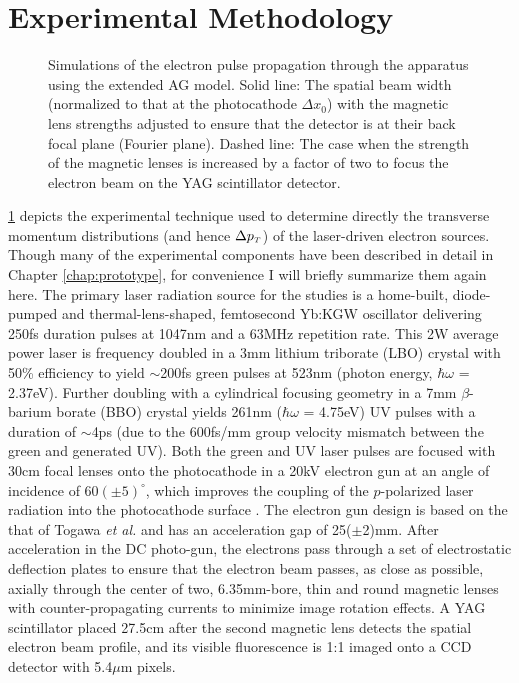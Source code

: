 \section{Experimental Methodology} \label{sec:photocathode-method}

\begin{figure}
  \centering
  
  \caption[Beam profile simulation of experimental setup]{
    Simulations of the electron pulse propagation through the apparatus using the extended AG model.  
    Solid line: The spatial beam width (normalized to that at the photocathode $\Delta x_0$) with the magnetic lens strengths adjusted to ensure that the detector is at their back focal plane (Fourier plane).
    Dashed line: The case when the strength of the magnetic lenses is increased by a factor of two to focus the electron beam on the YAG scintillator detector.
  }
  \label{fig:transverse-measurement}
\end{figure}

\ref{fig:transverse-measurement} depicts the experimental technique used to determine directly the transverse momentum distributions (and hence $\Delta p_{{\scriptscriptstyle T}}$) of the laser-driven electron sources.
Though many of the experimental components have been described in detail in Chapter \ref{chap:prototype}, for convenience I will briefly summarize them again here.
The primary laser radiation source for the studies is a home-built, diode-pumped and thermal-lens-shaped, femtosecond Yb:KGW oscillator \cite{berger_high-power_2008} delivering 250fs duration pulses at 1047nm and a 63MHz repetition rate.
This 2W average power laser is frequency doubled in a 3mm lithium triborate (LBO) crystal with 50\% efficiency to yield $\sim$200fs green pulses at 523nm (photon energy, $\hbar \omega$ = 2.37eV).
Further doubling with a cylindrical focusing geometry in a 7mm $\beta$-barium borate (BBO) crystal yields 261nm ($\hbar \omega$ = 4.75eV) UV pulses with a duration of $\sim$4ps (due to the 600fs/mm group velocity mismatch between the green and generated UV).
Both the green and UV laser pulses are focused with 30cm focal lenses onto the photocathode in a 20kV electron gun at an angle of incidence of $60(\pm5)^{\circ}$, which improves the coupling of the $p$-polarized laser radiation into the photocathode surface \cite{berger_dc_2009}.
The electron gun design is based on the that of Togawa \textit{et al.} \cite{berger_dc_2009,togawa_ceb6_2007} and has an acceleration gap of 25($\pm$2)mm.
After acceleration in the DC photo-gun, the electrons pass through a set of electrostatic deflection plates to ensure that the electron beam passes, as close as possible, axially through the center of two, 6.35mm-bore, thin and round magnetic lenses with counter-propagating currents to minimize image rotation effects.
A YAG scintillator placed 27.5cm after the second magnetic lens detects the spatial electron beam profile, and its visible fluorescence is 1:1 imaged onto a CCD detector with 5.4$\mu$m pixels. 

